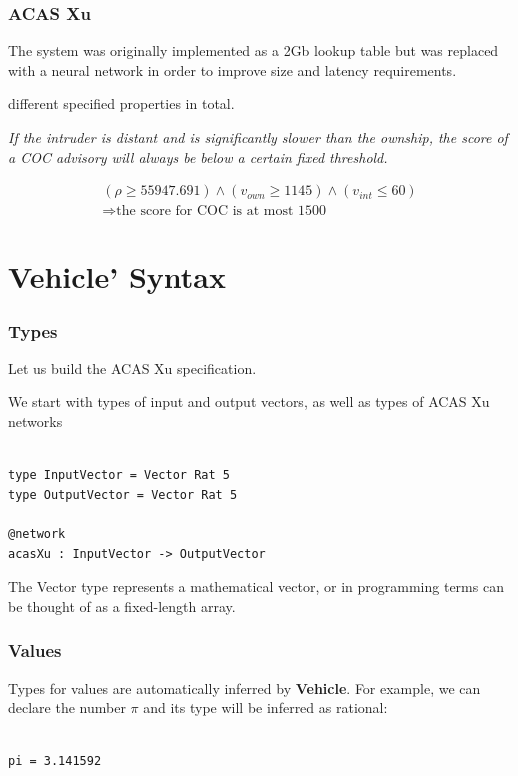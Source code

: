 \documentclass{beamer}
\begin{document}
\begin{frame}
\frametitle{ACAS Xu}
The system was originally implemented as a 2Gb lookup table but was replaced with a neural network in order to improve size and latency requirements.

 different specified properties in total.

\pause
\begin{definition}
\emph{If the intruder is distant and is significantly slower than the ownship, the score of a COC advisory will always be below a certain fixed threshold.}
\end{definition}

\pause
\begin{block}{}
\begin{equation*}
\begin{array}{l}
(\rho \geq 55947.691) \wedge
(v_{own} \geq 1145) \wedge (v_{int} \leq 60)  \\
\Rightarrow \text{the score for COC is at most 1500}
\end{array}
\end{equation*}
\end{block}

\end{frame}


\section{Vehicle' Syntax}

\begin{frame}[fragile]
\frametitle{Types}
Let us build the ACAS Xu specification.

We start with types of input and output vectors, as well as types of ACAS Xu networks

\begin{verbatim}

type InputVector = Vector Rat 5
type OutputVector = Vector Rat 5

@network
acasXu : InputVector -> OutputVector
\end{verbatim}

\begin{block}{}

The Vector type represents a mathematical vector, or in programming terms can be thought of as a fixed-length array.
\end{block}
\end{frame}

\begin{frame}[fragile]
\frametitle{Values}

Types for values are automatically inferred by \textbf{Vehicle}. For example, we can declare the number $\pi$ and its type will be inferred as rational:

\begin{verbatim}

pi = 3.141592
\end{verbatim}
\end{frame}
\end{document}
